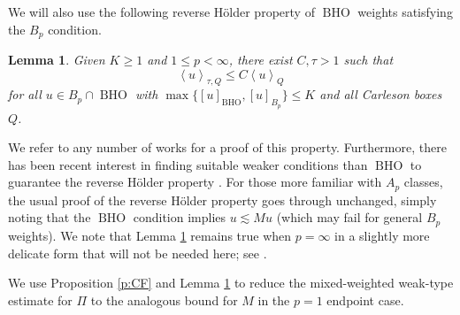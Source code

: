 \documentclass{amsart}
\newcommand{\avg}[1]{\left\langle {#1}\right\rangle}
\newtheorem{lemma}[theorem]{Lemma}
\theoremstyle{definition}
\numberwithin{equation}{section}
\DeclareMathOperator{\BHO}{BHO}
\begin{document}
We will also use the following reverse H\"older property of $\BHO$ weights satisfying the $B_{p}$ condition.
\begin{lemma}\label{l:RH}
Given $K \ge 1$ and $1 \le p < \infty$, there exist $C,\tau > 1$ such that 
 	\[ \avg{u}_{\tau,Q} \le C \avg{u}_Q \]
for all $u \in B_p\cap\BHO$ with 
 	$\max\{ [u]_{\BHO}, [u]_{B_p} \} \le K$
and all Carleson boxes $Q$.
\end{lemma}
\noindent We refer to any number of works \cites{APR19,SW23,Bor04} for a proof of this property. Furthermore, there has been recent interest in finding suitable weaker conditions than $\BHO$ to guarantee the reverse H\"older property \cites{MP25,Gok25}. For those more familiar with $A_p$ classes, the usual proof of the reverse H\"older property \cite{CF74} goes through unchanged, simply noting that the $\BHO$ condition implies $u \lesssim Mu$ (which may fail for general $B_p$ weights). We note that Lemma \ref{l:RH} remains true when $p=\infty$ in a slightly more delicate form that will not be needed here; see \cite{SW23}. 

\noindent We use Proposition \ref{p:CF} and Lemma \ref{l:RH} to reduce the mixed-weighted weak-type estimate for $\Pi$ to the analogous bound for $M$ in the $p=1$ endpoint case. 
\end{document}
